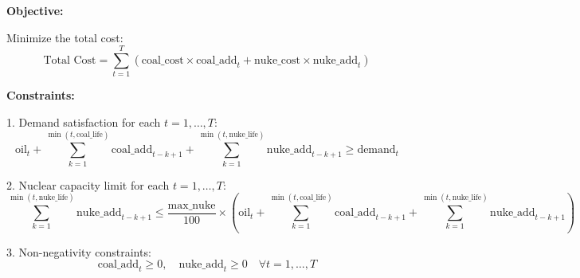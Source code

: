 \documentclass{article}
\begin{document}
\textbf{Objective:}

Minimize the total cost:
\[
\text{Total Cost} = \sum_{t=1}^{T} \left( \text{coal\_cost} \times \text{coal\_add}_t + \text{nuke\_cost} \times \text{nuke\_add}_t \right)
\]

\textbf{Constraints:}

1. Demand satisfaction for each \( t = 1, \ldots, T \):
\[
\text{oil}_t + \sum_{k=1}^{\min(t, \text{coal\_life})} \text{coal\_add}_{t-k+1} + \sum_{k=1}^{\min(t, \text{nuke\_life})} \text{nuke\_add}_{t-k+1} \geq \text{demand}_t
\]

2. Nuclear capacity limit for each \( t = 1, \ldots, T \):
\[
\sum_{k=1}^{\min(t, \text{nuke\_life})} \text{nuke\_add}_{t-k+1} \leq \frac{\text{max\_nuke}}{100} \times \left( \text{oil}_t + \sum_{k=1}^{\min(t, \text{coal\_life})} \text{coal\_add}_{t-k+1} + \sum_{k=1}^{\min(t, \text{nuke\_life})} \text{nuke\_add}_{t-k+1} \right)
\]

3. Non-negativity constraints:
\[
\text{coal\_add}_t \geq 0, \quad \text{nuke\_add}_t \geq 0 \quad \forall t = 1, \ldots, T
\]
\end{document}
